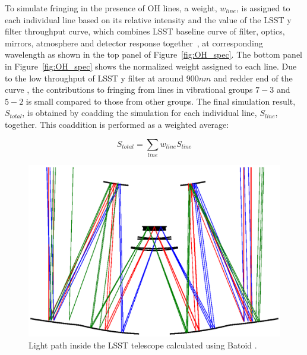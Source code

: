 \documentclass[twocolumn]{aastex63} %
\begin{document}
\begin{CJK*}{UTF8}{gbsn}


To simulate fringing in the presence of OH lines, a weight, $w_{line}$, is assigned to each individual line based on its relative intensity and the value of the LSST y filter throughput curve, which combines LSST baseline curve of filter, optics, mirrors, atmosphere and detector response together~\citep{Ivezi19}, at corresponding wavelength as shown in the top panel of Figure~\ref{fig:OH_spec}. 
The bottom panel in Figure~\ref{fig:OH_spec} shows the normalized weight assigned to each line. Due to the low throughput of LSST y filter at around $900nm$ and redder end of the curve , the contributions to fringing from lines in vibrational groups $7-3$ and $5-2$ is small compared to those from other groups. The final simulation result, $S_{total}$, is obtained by coadding the simulation for each individual line, $S_{line}$, together. This coaddition is performed as a weighted average:

\begin{equation} \label{eq:OH lines}
    S_{total} = \sum_{line}w_{line} S_{line}
\end{equation}

\begin{figure}[t]
\centering
\includegraphics[scale = 0.4]{light_tracing.eps}
\caption{Light path inside the LSST telescope calculated using Batoid \citep{Mayers19}.}
\label{fig:batoid-light-tracing}
\end{figure}



\end{CJK*}
\end{document}
